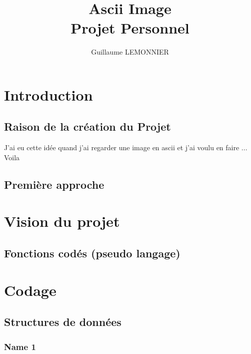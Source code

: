 \documentclass[a4paper,12pt]{article} %
\author{Guillaume LEMONNIER}
\title{Ascii Image\\Projet Personnel}
\begin{document}
\maketitle

\newpage

\tableofcontents

\newpage

\section{Introduction}

\subsection{Raison de la création du Projet}

J'ai eu cette idée quand j'ai regarder une image en ascii et j'ai voulu en faire ... Voila

\subsection{Première approche}

\newpage

\section{Vision du projet}

\subsection{Fonctions codés (pseudo langage)}

\newpage

\section{Codage}

\subsection{Structures de données}

\subsubsection{Name 1}
\end{document}
